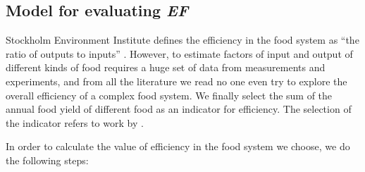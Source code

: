 \documentclass[12pt]{article}
\begin{document}
\subsection{Model for evaluating \textit{EF}} \label{sec:EF}

Stockholm Environment Institute defines the efficiency in the food system as ``the ratio of outputs to inputs'' \cite{cite:Efficiency_1}. However, to estimate factors of input and output of different kinds of food requires a huge set of data from measurements and experiments, and from all the literature we read no one even try to explore the overall efficiency of a complex food system. We finally select the sum of the annual food yield of different food as an indicator for efficiency. The selection of the indicator refers to work by \cite{cite:Esti_efficiency}. 

In order to calculate the value of efficiency in the food system we choose, we do the following steps:
\end{document}
